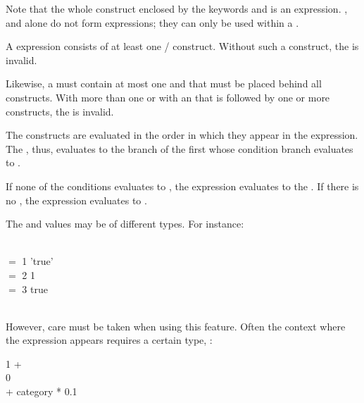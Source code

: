 Note that the whole construct enclosed by
the keywords  and 
is an expression. , 
and  alone do not form expressions;
they can only be used within a .

A  expression consists of at least
one / construct.
Without such a construct, the 
is invalid.

Likewise, a  must contain at most
one 
and that 
must be placed behind all  constructs.
With more than one 
or with an  that is followed
by one or more  constructs,
the  is invalid.

The  constructs are evaluated
in the order in which they appear in the  expression.
The , thus, evaluates
to the  branch of the first 
whose condition branch evaluates to .

If none of the  conditions evaluates to ,
the  expression evaluates
to the  .
If there is no ,
the  expression
evaluates to .

The  and  values
may be of different types.
For instance:

\\
\hspace*{1cm}  $=$ 1
 'true' \\
\hspace*{1cm}  $=$ 2
 1 \\
\hspace*{1cm}  $=$ 3
 true \\
\hspace*{1cm}  \\

However, care must be taken when using this feature.
Often the context where the  expression
appears requires a certain type, \eg: 

 1 +
\\
\hspace*{2.5cm}  
 0 \\
\hspace*{2.5cm}  + category * 0.1 \\
\hspace*{2cm}

